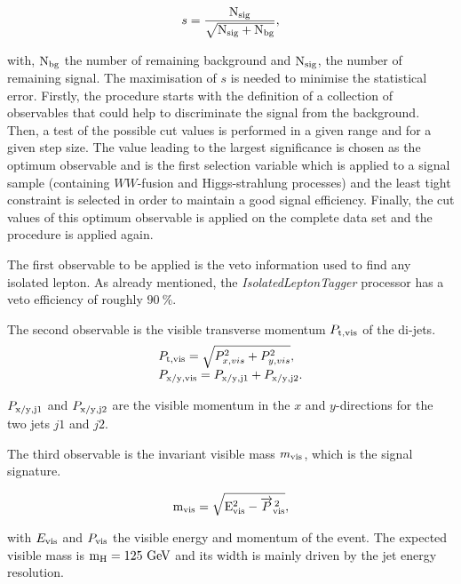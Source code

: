   \begin{equation}
    s = \frac{\rm{N_{sig}}}{\sqrt{\rm{N_{sig}}+ \rm{N_{bg}}}},
  \end{equation}

  with, $\rm{N_{bg}}$ the number of remaining background and $\rm{N_{sig}}$, the number of remaining signal.
  The maximisation of $s$ is needed to minimise the statistical error.
  Firstly, the procedure starts with the definition of a collection of observables that could help to discriminate the signal from the background.
  Then, a test of the possible cut values is performed in a given range and for a given step size.
  The value leading to the largest significance is chosen as the optimum observable and is the first selection variable which is applied to a signal sample (containing $WW$-fusion and Higgs-strahlung processes) and the least tight constraint is selected in order to maintain a good signal efficiency.
  Finally, the cut values of this optimum observable is applied on the complete data set and the procedure is applied again.

  The first observable to be applied is the veto information used to find any isolated lepton.
  As already mentioned, the \textit{IsolatedLeptonTagger} processor has a veto efficiency of roughly $90~\%$. 

  The second observable is the visible transverse momentum $P_{\rm{t,vis}}$ of the di-jets. 
  \begin{equation}
    \begin{array}{lcl}
      P_{\rm{t,vis}} = \sqrt{P^2_{x,vis} + P^2_{y,vis}}, \\
      P_{\rm{x/y,vis}} = P_{\rm{x/y,j1}} + P_{\rm{x/y,j2}}. 
    \end{array}
  \end{equation}
 
  $ P_{\rm{x/y,j1}}$ and $ P_{\rm{x/y,j2}}$ are the visible momentum in the $x$ and $y$-directions for the two jets $j1$ and $j2$.

  The third observable is the invariant visible mass $m_{\rm{vis}}$, which is the signal signature.

  \begin{equation}
   \rm{m_{vis}} = \sqrt{E^2_{\rm{vis}} - \overrightarrow{P}^{\,2}_{\rm{vis}}},
  \end{equation}

  with $E_{\rm{vis}}$ and $P_{\rm{vis}}$ the visible energy and momentum of the event.
  The expected visible mass is $\rm{m_H} = 125~\rm{GeV}$ and its width is mainly driven by the jet energy resolution.

